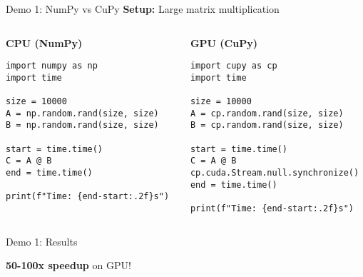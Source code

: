 \documentclass[10pt]{beamer}
\begin{document}
\begin{frame}[fragile]{Demo 1: NumPy vs CuPy}
  \textbf{Setup:} Large matrix multiplication
  
  \vspace{0.5em}
  \begin{columns}[T]
    \begin{column}{0.48\textwidth}
      \textbf{CPU (NumPy)}
      \tiny
\begin{verbatim}
import numpy as np
import time

size = 10000
A = np.random.rand(size, size)
B = np.random.rand(size, size)

start = time.time()
C = A @ B
end = time.time()

print(f"Time: {end-start:.2f}s")
\end{verbatim}
    \end{column}
    \begin{column}{0.48\textwidth}
      \textbf{GPU (CuPy)}
      \tiny
\begin{verbatim}
import cupy as cp
import time

size = 10000
A = cp.random.rand(size, size)
B = cp.random.rand(size, size)

start = time.time()
C = A @ B
cp.cuda.Stream.null.synchronize()
end = time.time()

print(f"Time: {end-start:.2f}s")
\end{verbatim}
    \end{column}
  \end{columns}
\end{frame}

\begin{frame}{Demo 1: Results}
  \begin{center}
  \end{center}
  
  \vspace{1em}
  \centering
  \Large \textbf{50-100x speedup} on GPU!
\end{frame}
\end{document}
